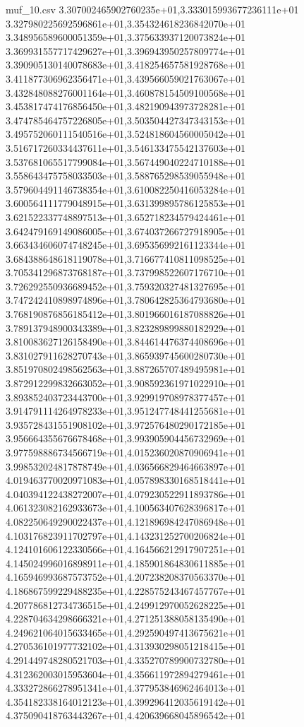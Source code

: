 \begin{filecontents*}{muf_10.csv}
3.307002465902760235e+01,3.333015993677236111e+01
3.327980225692596861e+01,3.354324618236842070e+01
3.348956589600051359e+01,3.375633937120073824e+01
3.369931557717429627e+01,3.396943950257809774e+01
3.390905130140078683e+01,3.418254657581928768e+01
3.411877306962356471e+01,3.439566059021763067e+01
3.432848088276001164e+01,3.460878154509100568e+01
3.453817474176856450e+01,3.482190943973728281e+01
3.474785464757226805e+01,3.503504427347343153e+01
3.495752060111540516e+01,3.524818604560005042e+01
3.516717260334437611e+01,3.546133475542137603e+01
3.537681065517799084e+01,3.567449040224710188e+01
3.558643475758033503e+01,3.588765298539055948e+01
3.579604491146738354e+01,3.610082250416053284e+01
3.600564111779048915e+01,3.631399895786125853e+01
3.621522337748897513e+01,3.652718234579424461e+01
3.642479169149086005e+01,3.674037266727918905e+01
3.663434606074748245e+01,3.695356992161123344e+01
3.684388648618119078e+01,3.716677410811098525e+01
3.705341296873768187e+01,3.737998522607176710e+01
3.726292550936689452e+01,3.759320327481327695e+01
3.747242410898974896e+01,3.780642825364793680e+01
3.768190876856185412e+01,3.801966016187088826e+01
3.789137948900343389e+01,3.823289899880182929e+01
3.810083627126158490e+01,3.844614476374408696e+01
3.831027911628270743e+01,3.865939745600280730e+01
3.851970802498562563e+01,3.887265707489495981e+01
3.872912299832663052e+01,3.908592361971022910e+01
3.893852403723443700e+01,3.929919708978377457e+01
3.914791114264978233e+01,3.951247748441255681e+01
3.935728431551908102e+01,3.972576480290172185e+01
3.956664355676678468e+01,3.993905904456732969e+01
3.977598886734566719e+01,4.015236020870906941e+01
3.998532024817878749e+01,4.036566829464663897e+01
4.019463770020971083e+01,4.057898330168518441e+01
4.040394122438272007e+01,4.079230522911893786e+01
4.061323082162933673e+01,4.100563407628396817e+01
4.082250649290022437e+01,4.121896984247086948e+01
4.103176823911702797e+01,4.143231252700206824e+01
4.124101606122330566e+01,4.164566212917907251e+01
4.145024996016898911e+01,4.185901864830611885e+01
4.165946993687573752e+01,4.207238208370563370e+01
4.186867599229488235e+01,4.228575243467457767e+01
4.207786812734736515e+01,4.249912970052628225e+01
4.228704634298666321e+01,4.271251388058135490e+01
4.249621064015633465e+01,4.292590497413675621e+01
4.270536101977732102e+01,4.313930298051218415e+01
4.291449748280521703e+01,4.335270789900732780e+01
4.312362003015953604e+01,4.356611972894279461e+01
4.333272866278951341e+01,4.377953846962464013e+01
4.354182338164012123e+01,4.399296412035619142e+01
4.375090418763443267e+01,4.420639668045896542e+01

\end{filecontents*}
